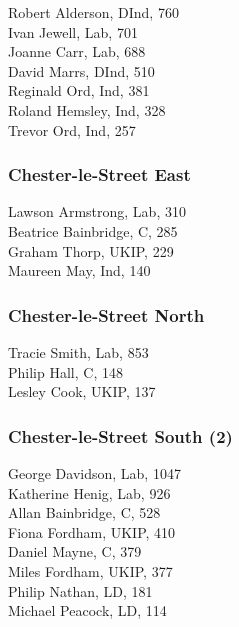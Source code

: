 \documentclass[a4paper,openany,10pt]{book}
\begin{document}


Robert Alderson, DInd, 760\\
Ivan Jewell, Lab, 701\\
Joanne Carr, Lab, 688\\
David Marrs, DInd, 510\\
Reginald Ord, Ind, 381\\
Roland Hemsley, Ind, 328\\
Trevor Ord, Ind, 257\\


\subsubsection*{Chester-le-Street East}



Lawson Armstrong, Lab, 310\\
Beatrice Bainbridge, C, 285\\
Graham Thorp, UKIP, 229\\
Maureen May, Ind, 140\\


\subsubsection*{Chester-le-Street North}



Tracie Smith, Lab, 853\\
Philip Hall, C, 148\\
Lesley Cook, UKIP, 137\\


\subsubsection*{Chester-le-Street South (2)}



George Davidson, Lab, 1047\\
Katherine Henig, Lab, 926\\
Allan Bainbridge, C, 528\\
Fiona Fordham, UKIP, 410\\
Daniel Mayne, C, 379\\
Miles Fordham, UKIP, 377\\
Philip Nathan, LD, 181\\
Michael Peacock, LD, 114\\
\end{document}
